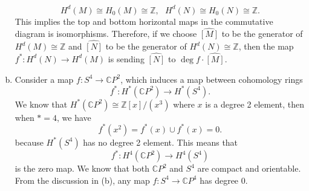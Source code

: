\documentclass[letterpaper, 12pt]{article}
\begin{document}
\begin{solution}
\begin{enumerate}[(a)]
\[H^d(M)\cong H_0(M)\cong \mathbb{Z},\ \ \ H^d(N)\cong H_0(N)\cong \mathbb{Z}.\]
This implies the top and bottom horizontal maps in the commutative diagram is isomorphisms. Therefore, if we choose \(\widehat{[M]}\) to be the generator of \(H^d(M)\cong \mathbb{Z}\) and \(\widehat{[N]}\) to be the generator of \(H^d(N)\cong \mathbb{Z}\), then the map \(f^*:H^d(N)\rightarrow H^d(M)\) is sending \(\widehat{[N]}\) to \(\deg f\cdot \widehat{[M]}\).
\item Consider a map \(f:S^4\rightarrow \mathbb{C}P^2\), which induces a map between cohomology rings 
\[f^*:H^*(\mathbb{C}P^2)\rightarrow H^*(S^4).\]
We know that \(H^*(\mathbb{C}P^2)\cong \mathbb{Z}[x]/(x^3)\) where \(x\) is a degree 2 element, then when \(*=4\), we have 
\[f^*(x^2)=f^*(x)\cup f^*(x)=0.\]
because \(H^*(S^4)\) has no degree 2 element. This means that 
\[f^*:H^4(\mathbb{C}P^2)\rightarrow H^4(S^4)\]
is the zero map. We know that both \(\mathbb{C}P^2\) and \(S^4\) are compact and orientable. From the discussion in (b), any map \(f:S^4\rightarrow \mathbb{C}P^4\) has degree \(0\). 
\end{enumerate}
\end{solution}
\end{document}
